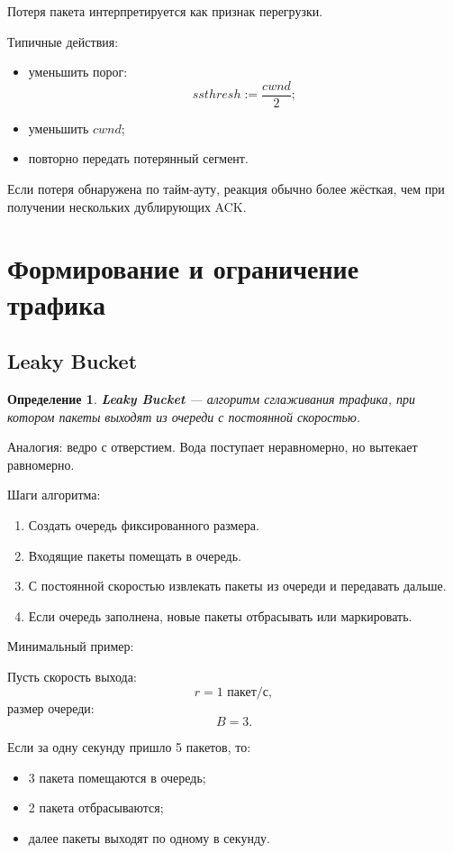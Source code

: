 \documentclass[12pt,a4paper]{article}
\newtheorem{definition}{Определение}
\begin{document}
Потеря пакета интерпретируется как признак перегрузки.

Типичные действия:
\begin{itemize}
    \item уменьшить порог:
    \[
    ssthresh := \frac{cwnd}{2};
    \]
    \item уменьшить $cwnd$;
    \item повторно передать потерянный сегмент.
\end{itemize}

Если потеря обнаружена по тайм-ауту, реакция обычно более жёсткая, чем при получении нескольких дублирующих ACK.

\section{Формирование и ограничение трафика}

\subsection{Leaky Bucket}

\begin{definition}
\textbf{Leaky Bucket} --- алгоритм сглаживания трафика, при котором пакеты выходят из очереди с постоянной скоростью.
\end{definition}

Аналогия: ведро с отверстием. Вода поступает неравномерно, но вытекает равномерно.

Шаги алгоритма:
\begin{enumerate}
    \item Создать очередь фиксированного размера.
    \item Входящие пакеты помещать в очередь.
    \item С постоянной скоростью извлекать пакеты из очереди и передавать дальше.
    \item Если очередь заполнена, новые пакеты отбрасывать или маркировать.
\end{enumerate}

Минимальный пример:

Пусть скорость выхода:
\[
r=1 \text{ пакет/с},
\]
размер очереди:
\[
B=3.
\]

Если за одну секунду пришло 5 пакетов, то:
\begin{itemize}
    \item 3 пакета помещаются в очередь;
    \item 2 пакета отбрасываются;
    \item далее пакеты выходят по одному в секунду.
\end{itemize}
\end{document}
